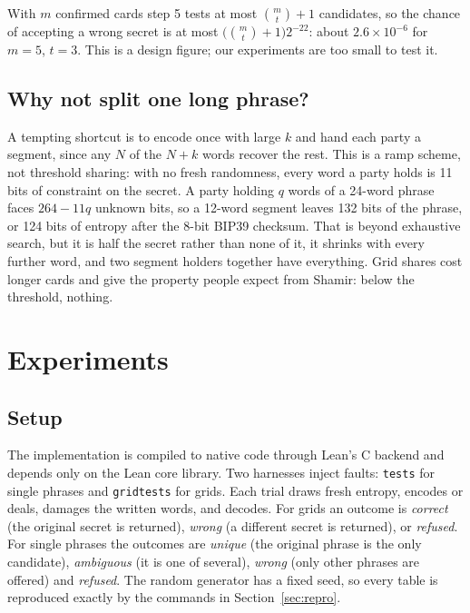 \documentclass[numeric]{anvil-paper}
\newcommand{\code}[1]{\texttt{#1}}
\begin{document}
With $m$ confirmed cards step 5 tests at most $\binom{m}{t}+1$ candidates, so
the chance of accepting a wrong secret is at most
$\bigl(\binom{m}{t}+1\bigr)2^{-22}$: about $2.6\times10^{-6}$ for $m=5$,
$t=3$. This is a design figure; our experiments are too small to test it.

\subsection{Why not split one long phrase?}
\label{sec:ramp}

A tempting shortcut is to encode once with large $k$ and hand each party a
segment, since any $N$ of the $N+k$ words recover the rest. This is a ramp
scheme, not threshold sharing: with no fresh randomness, every word a party
holds is 11 bits of constraint on the secret. A party holding $q$ words of a
24-word phrase faces $264-11q$ unknown bits, so a 12-word segment leaves 132
bits of the phrase, or 124 bits of entropy after the 8-bit BIP39 checksum. That
is beyond exhaustive search, but it is half the secret rather than none of it,
it shrinks with every further word, and two segment holders together have
everything. Grid shares cost longer cards and give the property people expect
from Shamir: below the threshold, nothing.

\section{Experiments}
\label{sec:experiments}

\subsection{Setup}

The implementation is compiled to native code through Lean's C backend and
depends only on the Lean core library. Two harnesses inject faults:
\code{tests} for single phrases and \code{gridtests} for grids. Each trial
draws fresh entropy, encodes or deals, damages the written words, and decodes.
For grids an outcome is \emph{correct} (the original secret is returned),
\emph{wrong} (a different secret is returned), or \emph{refused}. For single
phrases the outcomes are \emph{unique} (the original phrase is the only
candidate), \emph{ambiguous} (it is one of several), \emph{wrong} (only other
phrases are offered) and \emph{refused}. The random generator has a fixed seed,
so every table is reproduced exactly by the commands in
Section~\ref{sec:repro}.
\end{document}

